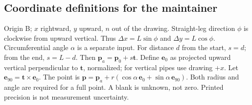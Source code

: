 \documentclass[11pt]{article}
\begin{document}
\subsection*{Coordinate definitions for the maintainer}
Origin B; $x$ rightward, $y$ upward, $n$ out of the drawing. Straight-leg direction $\phi$ is clockwise from upward vertical. Thus $\Delta x=L\sin\phi$ and $\Delta y=L\cos\phi$. Circumferential angle $\alpha$ is a separate input.
For distance $d$ from the start, $s=d$; from the end, $s=L-d$. Then $\mathbf{p}_{a}=\mathbf{p}_0+s\mathbf{t}$. Define $\mathbf{e}_0$ as projected upward vertical perpendicular to $\mathbf{t}$, normalized; for vertical pipes use drawing $+x$. Let $\mathbf{e}_{90}=\mathbf{t}\times\mathbf{e}_0$. The point is $\mathbf{p}=\mathbf{p}_{a}+r(\cos\alpha\,\mathbf{e}_0+\sin\alpha\,\mathbf{e}_{90})$.
Both radius and angle are required for a full point. A blank is unknown, not zero. Printed precision is not measurement uncertainty.
\end{document}
